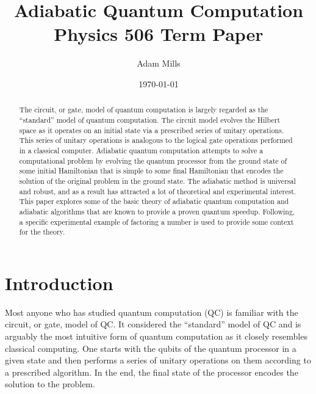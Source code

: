 \documentclass[%
 reprint,
 amsmath,amssymb,
 aps,
]{revtex4-1}
\begin{document}

\title{Adiabatic Quantum Computation \\ Physics 506 Term Paper}%

\author{Adam Mills}

\date{\today}%

\begin{abstract}
	The circuit, or gate, model of quantum computation is largely regarded as the ``standard'' model of quantum computation. The circuit model evolves the Hilbert space as it operates on an initial state via a prescribed series of unitary operations. This series of unitary operations is analogous to the logical gate operations performed in a classical computer. Adiabatic quantum computation attempts to solve a computational problem by evolving the quantum processor from the ground state of some initial Hamiltonian that is simple to some final Hamiltonian that encodes the solution of the original problem in the ground state. The adiabatic method is universal and robust, and as a result has attracted a lot of theoretical and experimental interest. This paper explores some of the basic theory of adiabatic quantum computation and adiabatic algorithms that are known to provide a proven quantum speedup. Following, a specific experimental example of factoring a number is used to provide some context for the theory.
\end{abstract}

\maketitle



\section{Introduction}

   Most anyone who has studied quantum computation (QC) is familiar with the circuit, or gate, model of QC\cite{Deutsch73}. It considered the ``standard'' model of QC and is arguably the most intuitive form of quantum computation as it closely resembles classical computing. One starts with the qubits of the quantum processor in a given state and then performs a series of unitary operations on them according to a prescribed algorithm. In the end, the final state of the processor encodes the solution to the problem. 
\end{document}
